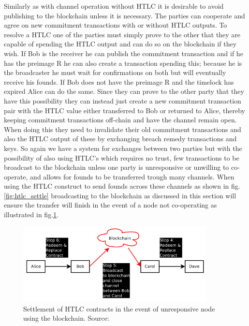 Similarly as with channel operation without HTLC it is desirable to avoid publishing to the blockchain unless it is necessary. The parties can cooperate and agree on new commitment transactions with or without HTLC outputs. To resolve a HTLC one of the parties must simply prove to the other that they are capable of spending the HTLC output and can do so on the blockchain if they wish. If Bob is the receiver he can publish the commitment transaction and if he has the preimage R he can also create a transaction spending this; because he is the broadcaster he must wait for confirmations on both but will eventually receive his founds. If Bob does not have the preimage R and the timelock has expired Alice can do the same. Since they can prove to the other party that they have this possibility they can instead just create a new commitment transaction pair with the HTLC value either transferred to Bob or returned to Alice, thereby keeping  commitment transactions off-chain and have the channel remain open. When doing this they need to invalidate their old commitment transactions and also the HTLC output of these by exchanging breach remedy transactions and keys. So again we have a system for exchanges between two parties but with the possibility of also using HTLC's which requires no trust, few transactions to be broadcast to the blockchain unless one party is unresponsive or unwilling to co-operate, and allows for founds to be transferred trough many channels.  
When using the HTLC construct to send founds across these channels as shown in fig.\ref{fig:htlc_settle} broadcasting to the blockchain as discussed in this section will ensure the transfer will finish in the event of a node not co-operating as illustrated in fig.\ref{fig:htlc_bc}.

\begin{figure}[h]
    \centering
    \includegraphics[width=10cm]{figures/htlc_bc.png}
    \caption{ Settlement of HTLC contracts in the event of unresponsive node using the blockchain. Source: \cite{poon2015bitcoin}}
    \label{fig:htlc_bc}
\end{figure}

